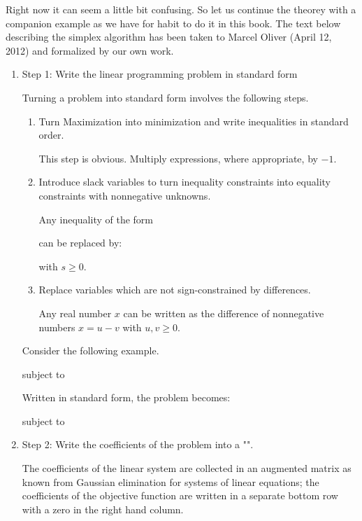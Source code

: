 	Right now it can seem a little bit confusing. So let us continue the theorey with a companion example as we have for habit to do it in this book.
	The text below describing the simplex algorithm has been taken to Marcel Oliver (April 12, 2012) and formalized by our own work.
	\begin{enumerate}
	\item Step 1: Write the linear programming problem in standard form
	
	Turning a problem into standard form involves the following steps.
	\begin{enumerate}
		\item Turn Maximization into minimization and write inequalities in
		standard order.
		
		This step is obvious.  Multiply expressions, where appropriate, by
		$-1$.
		
		\item Introduce slack variables to turn inequality constraints
		into equality constraints with nonnegative unknowns.
		
		Any inequality of the form
		
		can be replaced by:
		  
		with $s \geq 0$.
		
		\item Replace variables which are not sign-constrained by differences.
		
		Any real number $x$ can be written as the difference of nonnegative
		numbers $x=u-v$ with $u,v\geq 0$.
	\end{enumerate}

	Consider the following example.
	
	subject to 
	
	Written in standard form, the problem becomes:
	
	subject to 
	

	\item Step 2: Write the coefficients of the problem into a
	"".
	
	The coefficients of the linear system are collected in an augmented
	matrix as known from Gaussian elimination for systems of linear
	equations; the coefficients of the objective function are written in a
	separate bottom row with a zero in the right hand column.
	

\end{enumerate}
